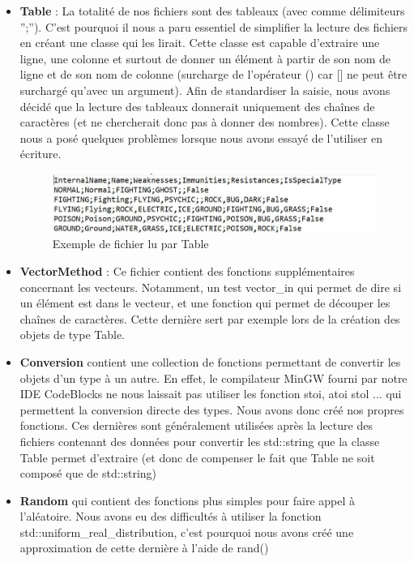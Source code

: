 \documentclass[a4paper,twoside, openany,11pt]{book}
\begin{document}
\begin{itemize}
\item \textbf{Table }: La totalité de nos fichiers sont des tableaux (avec comme délimiteurs '';''). C'est pourquoi il nous a paru essentiel de simplifier la lecture des fichiers en créant une classe qui les lirait. Cette classe est capable d'extraire une ligne, une colonne et surtout de donner un élément à partir de son nom de ligne et de son nom de colonne (surcharge de l'opérateur () car [] ne peut être surchargé qu'avec un argument). Afin de standardiser la saisie, nous avons décidé que la lecture des tableaux donnerait uniquement des chaînes de caractères (et ne chercherait donc pas à donner des nombres). Cette classe nous a posé quelques problèmes lorsque nous avons essayé de l'utiliser en écriture.

\begin{figure}[!h]\centering
\includegraphics[scale = 0.84]{Images/fichierTexteExemple.jpg}
\caption{Exemple de fichier lu par Table}
\end{figure}

\item \textbf{VectorMethod} : Ce fichier contient des fonctions supplémentaires concernant les vecteurs. Notamment, un test vector\_in qui permet de dire si un élément est dans le vecteur, et une fonction qui permet de découper les chaînes de caractères. Cette dernière sert par exemple lors de la création des objets de type Table. 
\item \textbf{Conversion} contient une collection de fonctions permettant de convertir les objets d'un type à un autre. En effet, le compilateur MinGW fourni par notre IDE CodeBlocks ne nous laissait pas utiliser les fonction stoi, atoi stol ... qui permettent la conversion directe des types. Nous avons donc créé nos propres fonctions. Ces dernières sont généralement utilisées après la lecture des fichiers contenant des données pour convertir les std::string que la classe Table permet d'extraire (et donc de compenser le fait que Table ne soit composé que de std::string)

\item \textbf{Random} qui contient des fonctions plus simples pour faire appel à l'aléatoire. Nous avons eu des difficultés à utiliser la fonction std::uniform\_real\_distribution, c'est pourquoi nous avons créé une approximation de cette dernière à l'aide de rand()


\end{itemize}
\end{document}
